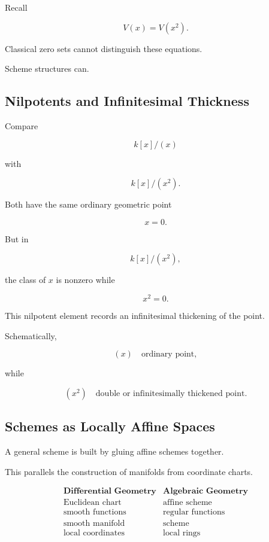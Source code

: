 Recall

\[
V(x)=V(x^2).
\]

Classical zero sets cannot distinguish these equations.

Scheme structures can.

\subsection{Nilpotents and Infinitesimal Thickness}
\label{subsec:nilpotents-infinitesimal-thickness}

Compare

\[
k[x]/(x)
\]

with

\[
k[x]/(x^2).
\]

Both have the same ordinary geometric point

\[
x=0.
\]

But in

\[
k[x]/(x^2),
\]

the class of \(x\) is nonzero while

\[
x^2=0.
\]

This nilpotent element records an infinitesimal thickening of the point.

Schematically,

\[
\boxed{
(x)
\quad\text{ordinary point},
}
\]

while

\[
\boxed{
(x^2)
\quad\text{double or infinitesimally thickened point}.
}
\]

\subsection{Schemes as Locally Affine Spaces}
\label{subsec:schemes-locally-affine}

A general scheme is built by gluing affine schemes together.

This parallels the construction of manifolds from coordinate charts.

\[
\boxed{
\begin{array}{c|c}
\textbf{Differential Geometry}
&
\textbf{Algebraic Geometry}
\\
\hline
\text{Euclidean chart}
&
\text{affine scheme}
\\
\text{smooth functions}
&
\text{regular functions}
\\
\text{smooth manifold}
&
\text{scheme}
\\
\text{local coordinates}
&
\text{local rings}
\end{array}
}
\]

